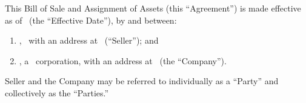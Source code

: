 
\bigskip

This Bill of Sale and Assignment of Assets (this ``Agreement'') is made effective as of
\effectiveDate\ (the ``Effective Date''), by and between:

\begin{enumerate}[leftmargin=*, label=(\arabic*)]
	\item \sellerName, \sellerType\ with an address at \sellerAddress\ (``Seller''); and
	\item \companyName, a \companyState\ corporation, with an address at \companyAddress\
	(the ``Company'').
\end{enumerate}

\noindent Seller and the Company may be referred to individually as a ``Party'' and
collectively as the ``Parties.''


